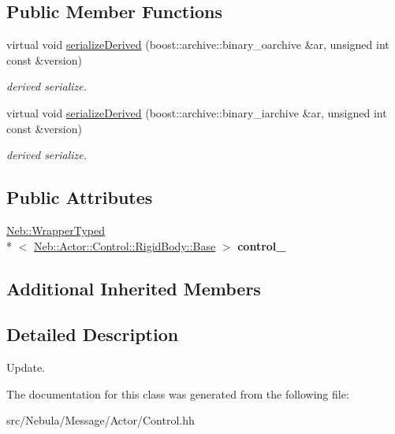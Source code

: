 \subsection*{Public Member Functions}
\begin{DoxyCompactItemize}
\item 
\hypertarget{classNeb_1_1Message_1_1Actor_1_1Control_1_1RigidBody_1_1Update_af4e2d2488ccc9bcf7c6589ccb06d1fef}{virtual void \hyperlink{classNeb_1_1Message_1_1Actor_1_1Control_1_1RigidBody_1_1Update_af4e2d2488ccc9bcf7c6589ccb06d1fef}{serialize\-Derived} (boost\-::archive\-::binary\-\_\-oarchive \&ar, unsigned int const \&version)}\label{classNeb_1_1Message_1_1Actor_1_1Control_1_1RigidBody_1_1Update_af4e2d2488ccc9bcf7c6589ccb06d1fef}

\begin{DoxyCompactList}\small\item\em derived serialize. \end{DoxyCompactList}\item 
\hypertarget{classNeb_1_1Message_1_1Actor_1_1Control_1_1RigidBody_1_1Update_a5008295bad96c1675dfe86b3220f8e62}{virtual void \hyperlink{classNeb_1_1Message_1_1Actor_1_1Control_1_1RigidBody_1_1Update_a5008295bad96c1675dfe86b3220f8e62}{serialize\-Derived} (boost\-::archive\-::binary\-\_\-iarchive \&ar, unsigned int const \&version)}\label{classNeb_1_1Message_1_1Actor_1_1Control_1_1RigidBody_1_1Update_a5008295bad96c1675dfe86b3220f8e62}

\begin{DoxyCompactList}\small\item\em derived serialize. \end{DoxyCompactList}\end{DoxyCompactItemize}
\subsection*{Public Attributes}
\begin{DoxyCompactItemize}
\item 
\hypertarget{classNeb_1_1Message_1_1Actor_1_1Control_1_1RigidBody_1_1Update_ae8ceff2f362b8b5273b158bf9ba15e6f}{\hyperlink{classNeb_1_1WrapperTyped}{Neb\-::\-Wrapper\-Typed}\\*
$<$ \hyperlink{classNeb_1_1Actor_1_1Control_1_1RigidBody_1_1Base}{Neb\-::\-Actor\-::\-Control\-::\-Rigid\-Body\-::\-Base} $>$ {\bfseries control\-\_\-}}\label{classNeb_1_1Message_1_1Actor_1_1Control_1_1RigidBody_1_1Update_ae8ceff2f362b8b5273b158bf9ba15e6f}

\end{DoxyCompactItemize}
\subsection*{Additional Inherited Members}


\subsection{Detailed Description}
Update. 

The documentation for this class was generated from the following file\-:\begin{DoxyCompactItemize}
\item 
src/\-Nebula/\-Message/\-Actor/Control.\-hh\end{DoxyCompactItemize}
